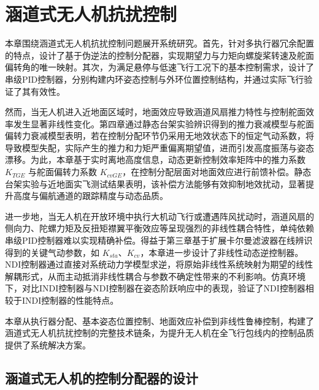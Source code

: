 \chapter{涵道式无人机抗扰控制}
本章围绕涵道式无人机抗扰控制问题展开系统研究。首先，针对多执行器冗余配置的特点，设计了基于伪逆法的控制分配器，实现期望力与力矩向螺旋桨转速及舵面偏转角的唯一映射。其次，为满足悬停与低速飞行工况下的基本控制需求，设计了串级PID控制器，分别构建内环姿态控制与外环位置控制结构，并通过实际飞行验证了其有效性。

然而，当无人机进入近地面区域时，地面效应导致涵道风扇推力特性与控制舵面效率发生显著非线性变化。第四章通过静态台架实验辨识得到的推力衰减模型与舵面偏转力衰减模型表明，若在控制分配环节仍采用无地效状态下的恒定气动系数，将导致模型失配，实际产生的推力和力矩严重偏离期望值，进而引发高度振荡与姿态漂移。为此，本章基于实时离地高度信息，动态更新控制效率矩阵中的推力系数 \(K_{TGE}\) 与舵面偏转力系数 \(K_{cvGE}\)，在控制分配层面对地面效应进行前馈补偿。静态台架实验与近地面实飞测试结果表明，该补偿方法能够有效抑制地效扰动，显著提升高度与偏航通道的跟踪精度与动态品质。

进一步地，当无人机在开放环境中执行大机动飞行或遭遇阵风扰动时，涵道风扇的侧向力、陀螺力矩及反扭矩襟翼平衡效应等呈现强烈的非线性耦合特性，单纯依赖串级PID控制器难以实现精确补偿。得益于第三章基于扩展卡尔曼滤波器在线辨识得到的关键气动参数，如 \(K_{sta}\)、\(K_{cv}\)，本章进一步设计了非线性动态逆控制器。NDI控制器通过直接对系统动力学模型求逆，将原始非线性系统映射为期望的线性解耦形式，从而主动抵消非线性耦合与参数不确定性带来的不利影响。仿真环境下，对比INDI控制器与NDI控制器在姿态阶跃响应中的表现，验证了NDI控制器相较于INDI控制器的性能特点。

本章从执行器分配、基本姿态位置控制、地面效应补偿到非线性鲁棒控制，构建了涵道式无人机抗扰控制的完整技术链条，为提升无人机在全飞行包线内的控制品质提供了系统解决方案。


\section{涵道式无人机的控制分配器的设计}

